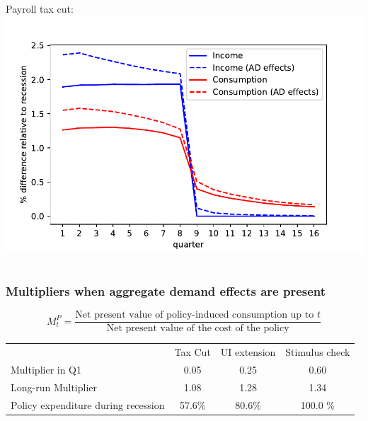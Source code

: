 \documentclass[pdflatex,aspectratio=169]{beamer}
\begin{document}
{\begin{frame}
\begin{columns}
			\begin{column}{0.50\textwidth}  
				Payroll tax cut:	
				\includegraphics[width=1.2\linewidth]{Code/HA-Models/FromPandemicCode/Figures/recession_taxcut_relrecession}
			\end{column}
		\end{columns}
		
	\end{frame}
	


}{}




\begin{frame}
\frametitle{Multipliers when aggregate demand effects are present}


\begin{equation*}
M^P_t = \frac{\text{Net present value of policy-induced consumption up to $t$}}{\text{Net present value of the cost of the policy}}
\end{equation*}


\begin{table}
	\begin{tabular}{@{}lccc@{}} 
								&Tax Cut   	& UI extension    	& Stimulus check    \\ 
		Multiplier in Q1		&0.05		& 0.25 				& 0.60				\\	
		Long-run Multiplier  	&1.08  		& 1.28  			& 1.34     			\\ 
		Policy expenditure during recession  &57.6\%  & 80.6\%  & 100.0 \%    		\\ 
	\end{tabular}  
\end{table}

\end{frame}
\end{document}
